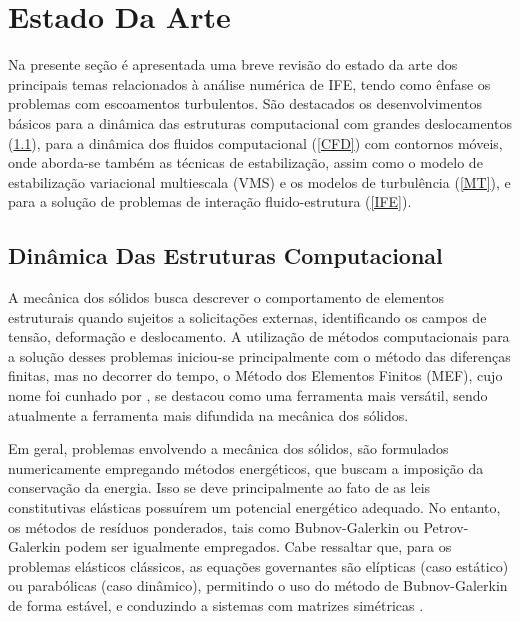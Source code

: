 \section{Estado Da Arte}

Na presente seção é apresentada uma breve revisão do estado da arte dos principais temas relacionados à análise numérica de IFE, tendo como ênfase os problemas com escoamentos turbulentos. São destacados os desenvolvimentos básicos para a dinâmica das estruturas computacional com grandes deslocamentos (\ref{CSD}), para a dinâmica dos fluidos computacional (\ref{CFD}) com contornos móveis, onde aborda-se também as técnicas de estabilização, assim como o modelo de estabilização variacional multiescala (VMS) e os modelos de turbulência (\ref{MT}), e para a solução de problemas de interação fluido-estrutura (\ref{IFE}).

\subsection{Dinâmica Das Estruturas Computacional} \label{CSD}

A mecânica dos sólidos busca descrever o comportamento de elementos estruturais quando sujeitos a solicitações externas, identificando os campos de tensão, deformação e deslocamento. A utilização de métodos computacionais para a solução desses problemas iniciou-se principalmente com o método das diferenças finitas, mas no decorrer do tempo, o Método dos Elementos Finitos (MEF), cujo nome foi cunhado por , se destacou como uma ferramenta mais versátil, sendo atualmente a ferramenta mais difundida na mecânica dos sólidos.

Em geral, problemas envolvendo a mecânica dos sólidos, são formulados numericamente empregando métodos energéticos, que buscam a imposição da conservação da energia. Isso se deve principalmente ao fato de as leis constitutivas elásticas possuírem um potencial energético adequado. No entanto, os métodos de resíduos ponderados, tais como Bubnov-Galerkin ou Petrov-Galerkin podem ser igualmente empregados. Cabe ressaltar que, para os problemas elásticos clássicos, as equações governantes são elípticas (caso estático) ou parabólicas (caso dinâmico), permitindo o uso do método de Bubnov-Galerkin de forma estável, e conduzindo a sistemas com matrizes simétricas \cite{de2012nonlinear}.

